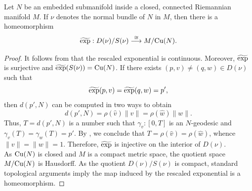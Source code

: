 \begin{thm}\label{Thomsp}
    Let $N$ be an embedded submanifold inside a closed, connected Riemannian manifold $M$. If $\nu$ denotes the normal bundle of $N$ in $M$, then there is a homeomorphism 
    \begin{displaymath}
        \widetilde{\textup{exp}}:D(\nu)/S(\nu)\stackrel{\cong}{\longrightarrow} M/\mathrm{Cu}(N).
    \end{displaymath}
\end{thm}
\begin{proof}
    It follows from  that the rescaled exponential is continuous. Moreover, $\widetilde{\textup{exp}}$ is surjective and $\widetilde{\textup{exp}}(S(\nu))=\mathrm{Cu}(N)$. If there exists $(p,v)\neq (q,w)\in D(\nu)$ such that 
    \begin{displaymath}
        \widetilde{\textup{exp}}(p,v)=\widetilde{\textup{exp}}(q,w)=p',
    \end{displaymath}
    then $d(p',N)$ can be computed in two ways to obtain 
    \begin{displaymath}
        d(p',N)=\rho(\hat{v})\|v\|=\rho(\hat{w})\|w\|.
    \end{displaymath}
    Thus, $T=d(p',N)$ is a number such that $\gamma_v:[0,T]$ is an $N$-geodesic and $\gamma_v(T)=\gamma_w(T)=p'$. By , we conclude that $T=\rho(\hat{v})=\rho(\hat{w})$, whence $\|v\|=\|w\|=1$. Therefore, $\widetilde{\textup{exp}}$ is injective on the interior of $D(\nu)$. \\
    \hfb As $\mathrm{Cu}(N)$ is closed and $M$ is a compact metric space, the quotient space $M/\mathrm{Cu}(N)$ is Hausdorff. As the quotient $D(\nu)/S(\nu)$ is compact, standard topological arguments imply the map induced by the rescaled exponential is a homeomorphism.
\end{proof}


